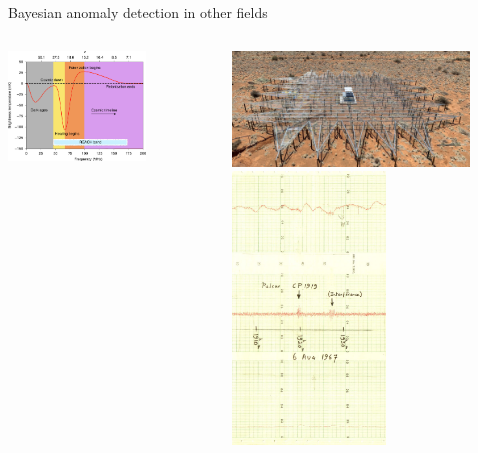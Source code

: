 \documentclass[aspectratio=169]{beamer}
\begin{document}
\begin{frame}{Bayesian anomaly detection in other fields}
  \begin{columns}
    \centering
    \includegraphics[width=0.68\textwidth]{images/21cm.png}
    \vspace{0.3cm}
    
    \includegraphics[width=0.85\textwidth]{images/reach.png}
    \centering
    \includegraphics[width=0.55\textwidth]{images/pulsar.jpeg}
  \end{columns}
\end{frame}
\end{document}
